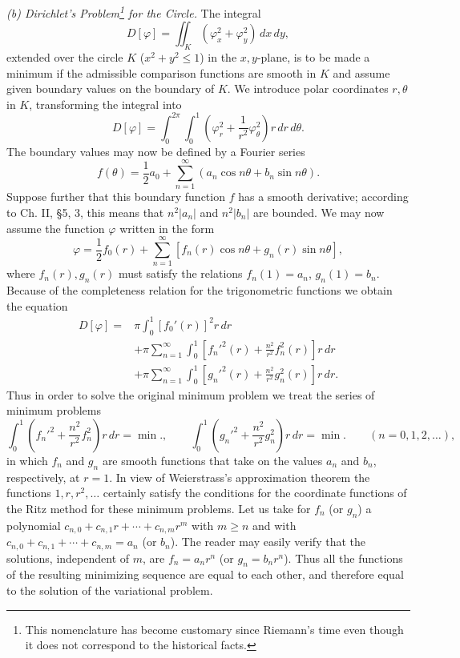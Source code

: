 \emph{(b) Dirichlet's Problem\footnote{This nomenclature has become customary since Riemann's time even though it does not correspond to the historical facts.} for the Circle.} The integral
\[
D[\varphi]=\iint_K(\varphi_x^2+\varphi_y^2)\,dx\,dy,
\]
extended over the circle $K$ ($x^2+y^2\le1$) in the $x,y$-plane, is to be made a minimum if the admissible comparison functions are smooth in $K$ and assume given boundary values on the boundary of $K$. We introduce polar coordinates $r,\theta$ in $K$, transforming the integral into
\[
D[\varphi]=\int_0^{2\pi}\int_0^1\left(\varphi_r^2+\frac{1}{r^2}\varphi_\theta^2\right)r\,dr\,d\theta.
\]
The boundary values may now be defined by a Fourier series
\[
f(\theta)=\frac12 a_0+\sum_{n=1}^{\infty}(a_n\cos n\theta+b_n\sin n\theta).
\]
Suppose further that this boundary function $f$ has a smooth derivative; according to Ch. II, \S5, 3, this means that $n^2|a_n|$ and $n^2|b_n|$ are bounded. We may now assume the function $\varphi$ written in the form
\[
\varphi=\frac12 f_0(r)+\sum_{n=1}^{\infty}[f_n(r)\cos n\theta+g_n(r)\sin n\theta],
\]
where $f_n(r),g_n(r)$ must satisfy the relations $f_n(1)=a_n$, $g_n(1)=b_n$. Because of the completeness relation for the trigonometric functions we obtain the equation
\[
\begin{aligned}
D[\varphi]={}&\pi\int_0^1[f_0'(r)]^2r\,dr\\
&+\pi\sum_{n=1}^{\infty}\int_0^1\left[f_n'^2(r)+\frac{n^2}{r^2}f_n^2(r)\right]r\,dr\\
&+\pi\sum_{n=1}^{\infty}\int_0^1\left[g_n'^2(r)+\frac{n^2}{r^2}g_n^2(r)\right]r\,dr.
\end{aligned}
\]
Thus in order to solve the original minimum problem we treat the series of minimum problems
\[
\int_0^1\left(f_n'^2+\frac{n^2}{r^2}f_n^2\right)r\,dr=\min.,
\qquad
\int_0^1\left(g_n'^2+\frac{n^2}{r^2}g_n^2\right)r\,dr=\min.
\qquad (n=0,1,2,\ldots),
\]
in which $f_n$ and $g_n$ are smooth functions that take on the values $a_n$ and $b_n$, respectively, at $r=1$. In view of Weierstrass's approximation theorem the functions $1,r,r^2,\ldots$ certainly satisfy the conditions for the coordinate functions of the Ritz method for these minimum problems. Let us take for $f_n$ (or $g_n$) a polynomial $c_{n,0}+c_{n,1}r+\cdots+c_{n,m}r^m$ with $m\ge n$ and with $c_{n,0}+c_{n,1}+\cdots+c_{n,m}=a_n$ (or $b_n$). The reader may easily verify that the solutions, independent of $m$, are $f_n=a_nr^n$ (or $g_n=b_nr^n$). Thus all the functions of the resulting minimizing sequence are equal to each other, and therefore equal to the solution of the variational problem.

